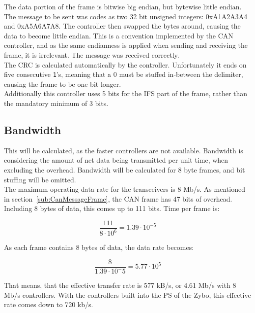 The data portion of the frame is bitwise big endian, but bytewise little endian. 
The message to be sent was codes as two 32 bit unsigned integers: 0xA1A2A3A4 and 0xA5A6A7A8.
The controller then swapped the bytes around, causing the data to become little endian.
This is a convention implemented by the CAN controller, and as the same endianness is applied when sending and receiving the frame, it is irrelevant. 
The message was received correctly.\\

The CRC is calculated automatically by the controller.
Unfortunately it ends on five consecutive \texttt{1}'s, meaning that a 0 must be stuffed in-between the delimiter, causing the frame to be one bit longer.\\

Additionally this controller uses 5 bits for the IFS part of the frame, rather than the mandatory minimum of 3 bits. 

\subsection{Bandwidth}\label{sub:CAN_bandwidth}
This will be calculated, as the faster controllers are not available.
Bandwidth is considering the amount of net data being transmitted per unit time, when excluding the overhead.
Bandwidth will be calculated for 8 byte frames, and bit stuffing will be omitted.\\

The maximum operating data rate for the transceivers is 8 Mb/s.
As mentioned in section~\ref{sub:CanMessageFrame}, the CAN frame has 47 bits of overhead. 
Including 8 bytes of data, this comes up to 111 bits. 
Time per frame is:

\begin{equation}
\frac{111}{8 \cdot 10^6} = 1.39 \cdot 10^{-5}
\end{equation}

As each frame contains 8 bytes of data, the data rate becomes:

\begin{equation}
\frac{8}{1.39 \cdot 10^-5}= 5.77 \cdot 10^5
\end{equation}

That means, that the effective transfer rate is 577 kB/s, or 4.61 Mb/s with 8 Mb/s controllers. 
With the controllers built into the PS of the Zybo, this effective rate comes down to 720 kb/s.

